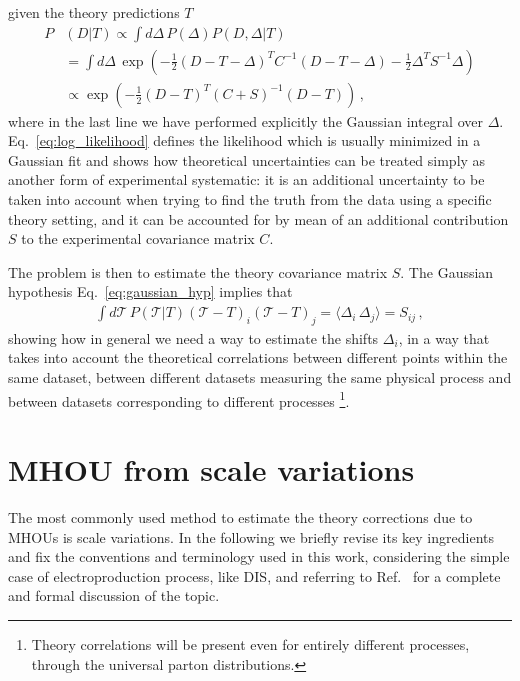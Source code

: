 given the theory predictions $T$
\begin{align}
    \label{eq:log_likelihood}
    P&\left(D|T\right) \propto 
    \int d\Delta\, P\left(\Delta\right)P\left(D, \Delta|T\right)  \nonumber\\
    &=\int d\Delta\, \exp\left(-\frac{1}{2}\left(D - T - \Delta\right)^T C^{-1} \left(D-T-\Delta\right) 
    -\frac{1}{2}\Delta^T S^{-1} \Delta \right) \nonumber \\
    &\propto \exp\left(-\frac{1}{2} \left(D-T\right)^T\left(C + S\right)^{-1} \left(D-T\right) \right)\,,
\end{align}
where in the last line we have performed explicitly the Gaussian integral over $\Delta$.
Eq.~\ref{eq:log_likelihood} defines the likelihood which is usually minimized in a Gaussian fit and shows how
theoretical uncertainties can be treated simply as another form of experimental systematic: 
it is an additional uncertainty to be taken into account when trying to find the truth from the data
using a specific theory setting, and it can be accounted for by mean of an additional contribution $S$ to
the experimental covariance matrix $C$.

%
The problem is then to estimate the theory covariance matrix $S$. The Gaussian hypothesis Eq.~\ref{eq:gaussian_hyp}
implies that 
\begin{align}
    \label{eq:def_th_cov_0}
    \int d\mathcal{T} \, P\left(\mathcal{T}|T\right) \left(\mathcal{T}-T\right)_i \left(\mathcal{T}-T\right)_j = 
    \langle \Delta_i \,\Delta_j \rangle = S_{ij}\,,
\end{align}
showing how in general we need a way to estimate the shifts $\Delta_i$, in a way that takes into account
the theoretical correlations between different points within the same dataset, between different datasets
measuring the same physical process and between datasets corresponding to different processes
\footnote{Theory correlations will be present even for entirely different processes, through the universal parton distributions.}.

\section{MHOU from scale variations}
The most commonly used method to estimate the theory corrections due to MHOUs is scale variations. 
In the following we briefly revise its key ingredients and fix the conventions and terminology used in this work,
considering the simple case of electroproduction process, like DIS, 
and referring to Ref.~\cite{AbdulKhalek:2019ihb} for a complete and formal discussion of the topic.

